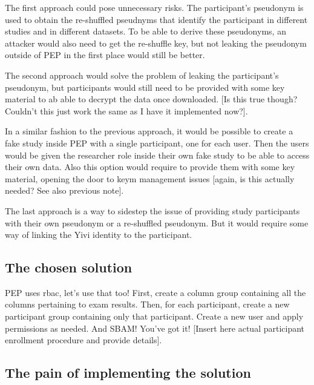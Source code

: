 \documentclass{report}
\begin{document}
The first approach could pose unnecessary risks. The participant's pseudonym is used to obtain the re-shuffled pseudnyms that identify the participant in different studies and in
different datasets. To be able to derive these pseudonyms, an attacker would also need to get the re-shuffle key, but not leaking the pseudonym outside of PEP in the first place would still be
better. \par
The second approach would solve the problem of leaking the participant's pseudonym, but participants would still need to be provided with some key material to ab able to decrypt
the data once downloaded. [Is this true though? Couldn't this just work the same as I have it implemented now?]. \par
In a similar fashion to the previous approach, it would be possible to create a fake study inside PEP with a single participant, one for each user. Then the users would be given
the researcher role inside their own fake study to be able to access their own data. Also this option would require to provide them with some key material, opening the door to keym
management issues [again, is this actually needed? See also previous note]. \par
The last approach is a way to sidestep the issue of providing study participants with their own pseudonym or a re-shuffled pseudonym. But it would require some way of linking the
Yivi identity to the participant.\par

\subsection{The chosen solution}
PEP uses rbac, let's use that too! First, create a column group containing all the columns pertaining to exam results. Then, for each participant, create a new participant group
containing only that participant. Create a new user and apply permissions as needed. And SBAM! You've got it! [Insert here actual participant enrollment procedure and provide
details].
\subsection{The pain of implementing the solution}
\fi


\printbibliography
\end{document}
